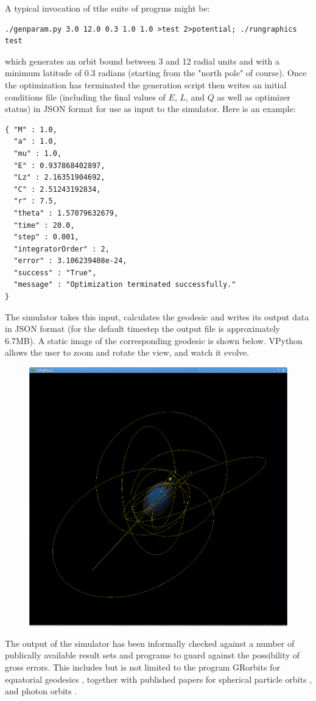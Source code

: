 \documentclass[11pt]{article}
\begin{document}
A typical invocation of tthe suite of progrms might be:
\begin{verbatim}
./genparam.py 3.0 12.0 0.3 1.0 1.0 >test 2>potential; ./rungraphics test
\end{verbatim}
which generates an orbit bound between 3 and 12 radial units and with a minimum latitude of 0.3 radians (starting from the "north pole" of course).
Once the optimization has terminated the generation script then writes an initial conditions file (including the final values of $E$, $L$, and $Q$ as well as optimizer status) in JSON format for use as input to the simulator.  Here is an example:
\begin{verbatim}
{ "M" : 1.0,
  "a" : 1.0,
  "mu" : 1.0,
  "E" : 0.937868402897,
  "Lz" : 2.16351904692,
  "C" : 2.51243192834,
  "r" : 7.5,
  "theta" : 1.57079632679,
  "time" : 20.0,
  "step" : 0.001,
  "integratorOrder" : 2,
  "error" : 3.106239408e-24,
  "success" : "True",
  "message" : "Optimization terminated successfully."
}
\end{verbatim}
The simulator takes this input, calculates the geodesic and writes its output data in JSON format (for the default timestep the output file is approximately 6.7MB).  A static image of the corresponding geodesic is shown below.  VPython allows the user to zoom and rotate the view, and watch it evolve.
\begin{figure}[h]
\includegraphics[width=\textwidth]{Screenshot}
\end{figure}
The output of the simulator has been informally checked against a number of publically available result sets and programs to guard against the possibility of gross errors.  This includes  but is not limited to the program GRorbits for equatorial geodesics \cite{grorbits}, together with published papers for spherical particle orbits \cite{teo}, and photon orbits \cite{kheng}.
\end{document}
